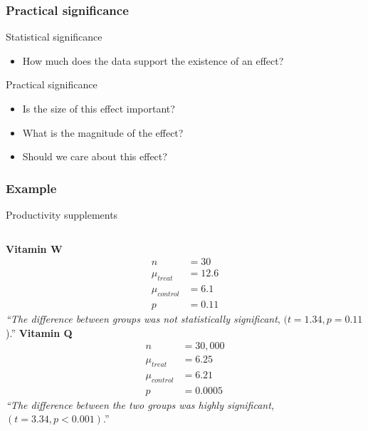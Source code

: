 \documentclass[12pt, block=fill]{beamer}
\begin{document}
\begin{frame}
  \frametitle{Practical significance}
  \begin{block}{Statistical significance}
    \begin{itemize}
    \item How much does the data support the existence of an effect?
    \end{itemize}
  \end{block}
  \begin{block}{Practical significance}
    \begin{itemize}
    \item Is the size of this effect important?
    \item What is the magnitude of the effect?
    \item Should we care about this effect?
    \end{itemize}
  \end{block}
\end{frame}
 
 \begin{frame}
   \frametitle{Example}
   \begin{exampleblock}{Productivity supplements}
     \vspace{1em}

     \begin{columns}[t]
       \textbf{Vitamin W}
       \begin{align*}
         n &= 30 \\ 
         \mu_{treat} &= 12.6 \\
         \mu_{control} & = 6.1 \\
         p &= 0.11
       \end{align*} 
        \textit{``The difference between groups was not
           statistically significant}, $(t=1.34, p=0.11$).''
       \textbf{Vitamin Q}
       \begin{align*}
         n &= 30,000 \\
         \mu_{treat} &= 6.25 \\
         \mu_{control} &= 6.21 \\
         p &= 0.0005
       \end{align*}
       \textit{``The difference between the two groups was highly
         significant}, $(t = 3.34, p<0.001)$.'' 
     \end{columns}
   \end{exampleblock}
 \end{frame}
\end{document}
